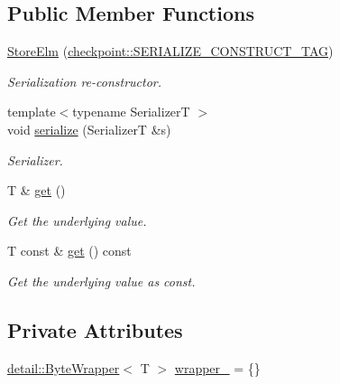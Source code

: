 \subsection*{Public Member Functions}
\begin{DoxyCompactItemize}
\item 
\hyperlink{structvt_1_1vrt_1_1collection_1_1storage_1_1_store_elm_3_01_t_00_01typename_01std_1_1enable__if_f645d7011e081ebef1092328b0917bfc_ad8dfd05ce5b4a6937906fce29733ac37}{Store\+Elm} (\hyperlink{namespacecheckpoint_a7ff642cff4d72d01a16ab10e9bc363ef}{checkpoint\+::\+S\+E\+R\+I\+A\+L\+I\+Z\+E\+\_\+\+C\+O\+N\+S\+T\+R\+U\+C\+T\+\_\+\+T\+AG})
\begin{DoxyCompactList}\small\item\em Serialization re-\/constructor. \end{DoxyCompactList}\item 
{\footnotesize template$<$typename SerializerT $>$ }\\void \hyperlink{structvt_1_1vrt_1_1collection_1_1storage_1_1_store_elm_3_01_t_00_01typename_01std_1_1enable__if_f645d7011e081ebef1092328b0917bfc_ae4824f71a4909c65fab811ef7b97f9aa}{serialize} (SerializerT \&s)
\begin{DoxyCompactList}\small\item\em Serializer. \end{DoxyCompactList}\item 
T \& \hyperlink{structvt_1_1vrt_1_1collection_1_1storage_1_1_store_elm_3_01_t_00_01typename_01std_1_1enable__if_f645d7011e081ebef1092328b0917bfc_aca0afee85781dbc7e76c3dff59ab4136}{get} ()
\begin{DoxyCompactList}\small\item\em Get the underlying value. \end{DoxyCompactList}\item 
T const  \& \hyperlink{structvt_1_1vrt_1_1collection_1_1storage_1_1_store_elm_3_01_t_00_01typename_01std_1_1enable__if_f645d7011e081ebef1092328b0917bfc_afd8bb1f887dfb0a9d165693b1c7040ae}{get} () const
\begin{DoxyCompactList}\small\item\em Get the underlying value as const. \end{DoxyCompactList}\end{DoxyCompactItemize}
\subsection*{Private Attributes}
\begin{DoxyCompactItemize}
\item 
\hyperlink{structvt_1_1vrt_1_1collection_1_1storage_1_1detail_1_1_byte_wrapper}{detail\+::\+Byte\+Wrapper}$<$ T $>$ \hyperlink{structvt_1_1vrt_1_1collection_1_1storage_1_1_store_elm_3_01_t_00_01typename_01std_1_1enable__if_f645d7011e081ebef1092328b0917bfc_ae24b9eb3e2adc8ea0aef2f6946aa0311}{wrapper\+\_\+} = \{\}
\end{DoxyCompactItemize}


